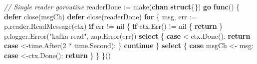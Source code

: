 \documentclass[
]{article}
\newenvironment{Shaded}{}{}
\newcommand{\BuiltInTok}[1]{\textcolor[rgb]{0.00,0.50,0.00}{#1}}
\newcommand{\CommentTok}[1]{\textcolor[rgb]{0.38,0.63,0.69}{\textit{#1}}}
\newcommand{\ControlFlowTok}[1]{\textcolor[rgb]{0.00,0.44,0.13}{\textbf{#1}}}
\newcommand{\DecValTok}[1]{\textcolor[rgb]{0.25,0.63,0.44}{#1}}
\newcommand{\KeywordTok}[1]{\textcolor[rgb]{0.00,0.44,0.13}{\textbf{#1}}}
\newcommand{\NormalTok}[1]{#1}
\newcommand{\OperatorTok}[1]{\textcolor[rgb]{0.40,0.40,0.40}{#1}}
\newcommand{\OtherTok}[1]{\textcolor[rgb]{0.00,0.44,0.13}{#1}}
\newcommand{\StringTok}[1]{\textcolor[rgb]{0.25,0.44,0.63}{#1}}
\begin{document}
\begin{Shaded}
\begin{Highlighting}[]
    \CommentTok{// Single reader goroutine}
\NormalTok{    readerDone }\OperatorTok{:=} \BuiltInTok{make}\OperatorTok{(}\KeywordTok{chan} \KeywordTok{struct}\OperatorTok{\{\})}
    \ControlFlowTok{go} \KeywordTok{func}\OperatorTok{()} \OperatorTok{\{}
        \ControlFlowTok{defer} \BuiltInTok{close}\OperatorTok{(}\NormalTok{msgCh}\OperatorTok{)}
        \ControlFlowTok{defer} \BuiltInTok{close}\OperatorTok{(}\NormalTok{readerDone}\OperatorTok{)}
        \ControlFlowTok{for} \OperatorTok{\{}
\NormalTok{            msg}\OperatorTok{,}\NormalTok{ err }\OperatorTok{:=}\NormalTok{ p}\OperatorTok{.}\NormalTok{reader}\OperatorTok{.}\NormalTok{ReadMessage}\OperatorTok{(}\NormalTok{ctx}\OperatorTok{)}
            \ControlFlowTok{if}\NormalTok{ err }\OperatorTok{!=} \OtherTok{nil} \OperatorTok{\{}
                \ControlFlowTok{if}\NormalTok{ ctx}\OperatorTok{.}\NormalTok{Err}\OperatorTok{()} \OperatorTok{!=} \OtherTok{nil} \OperatorTok{\{}
                    \ControlFlowTok{return}
                \OperatorTok{\}}
\NormalTok{                p}\OperatorTok{.}\NormalTok{logger}\OperatorTok{.}\NormalTok{Error}\OperatorTok{(}\StringTok{"kafka read"}\OperatorTok{,}\NormalTok{ zap}\OperatorTok{.}\NormalTok{Error}\OperatorTok{(}\NormalTok{err}\OperatorTok{))}
                \ControlFlowTok{select} \OperatorTok{\{}
                \ControlFlowTok{case} \OperatorTok{\textless{}{-}}\NormalTok{ctx}\OperatorTok{.}\NormalTok{Done}\OperatorTok{():}
                    \ControlFlowTok{return}
                \ControlFlowTok{case} \OperatorTok{\textless{}{-}}\NormalTok{time}\OperatorTok{.}\NormalTok{After}\OperatorTok{(}\DecValTok{2} \OperatorTok{*}\NormalTok{ time}\OperatorTok{.}\NormalTok{Second}\OperatorTok{):}
                \OperatorTok{\}}
                \ControlFlowTok{continue}
            \OperatorTok{\}}
            \ControlFlowTok{select} \OperatorTok{\{}
            \ControlFlowTok{case}\NormalTok{ msgCh }\OperatorTok{\textless{}{-}}\NormalTok{ msg}\OperatorTok{:}
            \ControlFlowTok{case} \OperatorTok{\textless{}{-}}\NormalTok{ctx}\OperatorTok{.}\NormalTok{Done}\OperatorTok{():}
                \ControlFlowTok{return}
            \OperatorTok{\}}
        \OperatorTok{\}}
    \OperatorTok{\}()}


\end{Highlighting}
\end{Shaded}
\end{document}
